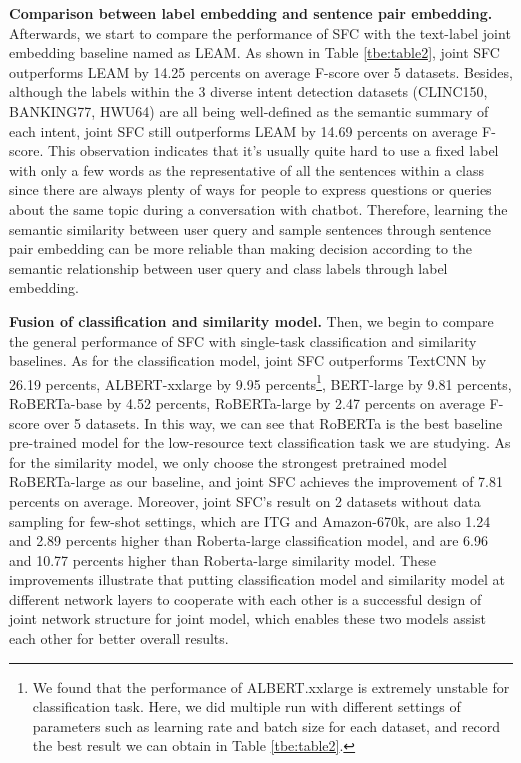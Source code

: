\documentclass[letterpaper]{article} %
\begin{document}
  \textbf{Comparison  between  label  embedding  and  sentence  pair embedding.}
  Afterwards,  we  start  to  compare the performance of SFC with the text-label
  joint  embedding  baseline  named as LEAM. As shown in Table \ref{tbe:table2},
  joint  SFC outperforms LEAM by 14.25 percents on average F-score over 5
  datasets.  Besides,  although the labels within the 3 diverse intent detection
  datasets  (CLINC150,  BANKING77,  HWU64)  are  all  being  well-defined as the
  semantic  summary  of  each intent, joint SFC still outperforms LEAM by
  14.69  percents  on  average  F-score.  This  observation  indicates that it's
  usually  quite  hard  to  use  a  fixed  label  with  only  a few words as the
  representative  of  all  the  sentences  within a class since there are always
  plenty of ways for people to express questions or queries about the same topic
  during   a   conversation  with  chatbot.  Therefore,  learning  the  semantic
  similarity  between  user  query  and  sample  sentences through sentence pair
  embedding  can be more reliable than making decision according to the semantic
  relationship between user query and class labels through label embedding.

  \textbf{Fusion  of  classification  and  similarity  model.} Then, we begin to
  compare  the  general  performance  of SFC with single-task classification and
  similarity  baselines.  As  for  the  classification  model,  joint SFC
  outperforms    TextCNN    by   26.19   percents,   ALBERT-xxlarge   by   9.95
  percents\footnote{We found that the performance of ALBERT.xxlarge is extremely
  unstable  for  classification  task.  Here, we did multiple run with different
  settings  of parameters such as learning rate and batch size for each dataset,
  and  record  the  best  result  we  can  obtain  in  Table \ref{tbe:table2}.},
  BERT-large  by  9.81 percents, RoBERTa-base by 4.52 percents, RoBERTa-large by
  2.47 percents on average F-score over 5 datasets. In this way, we can see that
  RoBERTa  is  the  best  baseline  pre-trained  model for the low-resource text
  classification  task  we  are  studying.  As for the similarity model, we only
  choose  the  strongest  pretrained  model  RoBERTa-large  as our baseline, and
  joint  SFC  achieves  the  improvement  of  7.81  percents  on average.
  Moreover,  joint  SFC's  result on 2 datasets without data sampling for
  few-shot  settings,  which  are  ITG  and  Amazon-670k, are also 1.24 and 2.89
  percents  higher  than  Roberta-large  classification  model, and are 6.96 and
  10.77  percents higher than Roberta-large similarity model. These improvements
  illustrate that putting classification model and similarity model at different
  network  layers  to  cooperate  with  each  other  is  a  successful design of
  joint network structure for joint model, which enables these two models
  assist each other for better overall results.
\end{document}
